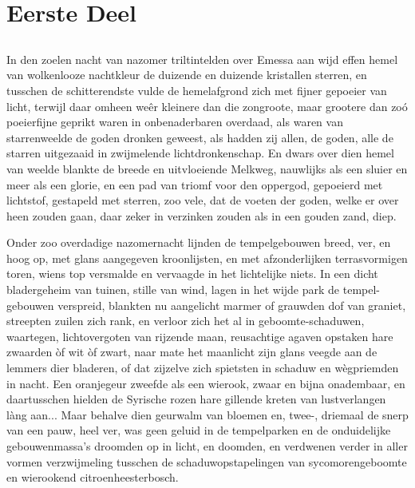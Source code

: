 \documentclass[a4paper, 12pt, oneside, dutch]{article}
\begin{document}
\pagestyle{fancy}
\fancyhf{}
\cfoot{\Fontauri{\thepage}}
\Large
\setlength{\parskip}{1mm plus1mm minus1mm}
\tableofcontents
\clearpage
\section{Eerste Deel}
\subsection{}
\paragraph{}
In den zoelen nacht van nazomer triltintelden over Emessa aan wijd effen hemel van wolkenlooze nachtkleur de duizende en duizende kristallen sterren, en tusschen de schitterendste vulde de hemelafgrond zich met fijner gepoeier van licht, terwijl daar omheen weêr kleinere dan die zongroote, maar grootere dan zoó poeierfijne geprikt waren in onbenaderbaren overdaad, als waren van starrenweelde de goden dronken geweest, als hadden zij allen, de goden, alle de starren uitgezaaid in zwijmelende lichtdronkenschap. En dwars over dien hemel van weelde blankte de breede en uitvloeiende Melkweg, nauwlijks als een sluier en meer als een glorie, en een pad van triomf voor den oppergod, gepoeierd met lichtstof, gestapeld met sterren, zoo vele, dat de voeten der goden, welke er over heen zouden gaan, daar zeker in verzinken zouden als in een gouden zand, diep.

Onder zoo overdadige nazomernacht lijnden de tempelgebouwen breed, ver, en hoog op, met glans aangegeven kroonlijsten, en met afzonderlijken terrasvormigen toren, wiens top versmalde en vervaagde in het lichtelijke niets. In een dicht bladergeheim van tuinen, stille van wind, lagen in het wijde park de tempel-gebouwen verspreid, blankten nu aangelicht marmer of grauwden dof van graniet, streepten zuilen zich rank, en verloor zich het al in geboomte-schaduwen, waartegen, lichtovergoten van rijzende maan, reusachtige agaven opstaken hare zwaarden òf wit òf zwart, naar mate het maanlicht zijn glans veegde aan de lemmers dier bladeren, of dat zijzelve zich spietsten in schaduw en wègpriemden in nacht. Een oranjegeur zweefde als een wierook, zwaar en bijna onadembaar, en daartusschen hielden de Syrische rozen hare gillende kreten van lustverlangen làng aan... Maar behalve dien geurwalm van bloemen en, twee-, driemaal de snerp van een pauw, heel ver, was geen geluid in de tempelparken en de onduidelijke gebouwenmassa's droomden op in licht, en doomden, en verdwenen verder in aller vormen verzwijmeling tusschen de schaduwopstapelingen van sycomorengeboomte en wierookend citroenheesterbosch.
\end{document}
